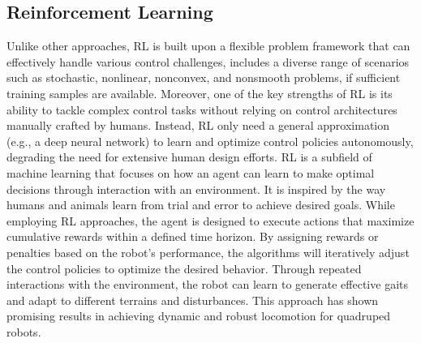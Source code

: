 \subsection{Reinforcement Learning}
Unlike other approaches, \ac{RL} is built upon a flexible problem framework that can effectively handle various control challenges, includes a diverse range of scenarios such as stochastic, nonlinear, nonconvex, and nonsmooth problems, if sufficient training samples are available. Moreover, one of the key strengths of \ac{RL} is its ability to tackle complex control tasks without relying on control architectures manually crafted by humans. Instead, \ac{RL} only need a general approximation (e.g., a deep neural network) to learn and optimize control policies autonomously, degrading the need for extensive human design efforts. \ac{RL} is a subfield of machine learning that focuses on how an agent can learn to make optimal decisions through interaction with an environment. It is inspired by the way humans and animals learn from trial and error to achieve desired goals. While employing \ac{RL} approaches, the agent is designed to execute actions that maximize cumulative rewards within a defined time horizon. By assigning rewards or penalties based on the robot's performance, the algorithms will iteratively adjust the control policies to optimize the desired behavior. Through repeated interactions with the environment, the robot can learn to generate effective gaits and adapt to different terrains and disturbances. This approach has shown promising results in achieving dynamic and robust locomotion for quadruped robots\cite{ji2022Concurrent}. 

